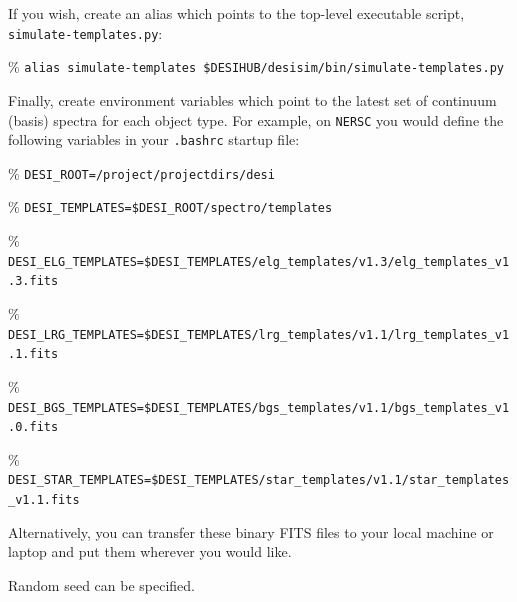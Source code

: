 \documentclass[12pt]{article}
\begin{document}
\noindent If you wish, create an alias which points to the top-level executable
script, {\tt simulate-templates.py}:
\begin{itemize*}
  \item[\%]{{\tt alias simulate-templates \$DESIHUB/desisim/bin/simulate-templates.py}}
\end{itemize*}

\noindent Finally, create environment variables which point to the latest set of
continuum (basis) spectra for each object type.  For example, on {\tt NERSC} you
would define the following variables in your {\tt .bashrc} startup file:
\begin{itemize*}
  \item[\%]{{\tt DESI\_ROOT=/project/projectdirs/desi}}
  \item[\%]{{\tt DESI\_TEMPLATES=\$DESI\_ROOT/spectro/templates}}
  \item[\%]{{\tt DESI\_ELG\_TEMPLATES=\$DESI\_TEMPLATES/elg\_templates/v1.3/elg\_templates\_v1.3.fits}}
  \item[\%]{{\tt DESI\_LRG\_TEMPLATES=\$DESI\_TEMPLATES/lrg\_templates/v1.1/lrg\_templates\_v1.1.fits}}
  \item[\%]{{\tt DESI\_BGS\_TEMPLATES=\$DESI\_TEMPLATES/bgs\_templates/v1.1/bgs\_templates\_v1.0.fits}}
  \item[\%]{{\tt DESI\_STAR\_TEMPLATES=\$DESI\_TEMPLATES/star\_templates/v1.1/star\_templates\_v1.1.fits}}
\end{itemize*}

\noindent Alternatively, you can transfer these binary FITS files to your local
machine or laptop and put them wherever you would like.  

Random seed can be specified.
\end{document}
